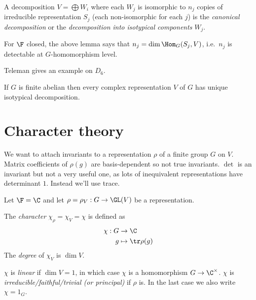 \documentclass[a4paper]{article}
\theoremstyle{definition}
\begin{document}
\begin{definition}
  A decomposition \(V = \bigoplus W_i\) where each \(W_j\) is isomorphic to \(n_j\) copies of irreducible representation \(S_j\) (each non-isomorphic for each \(j\)) is the \emph{canonical decomposition} or the \emph{decomposition into isotypical components} \(W_j\).
\end{definition}

For \(\F\) closed, the above lemma says that \(n_j = \dim \Hom_G(S_j, V)\), i.e.\ \(n_j\) is detectable at \(G\)-homomorphism level.

\begin{eg}
  Teleman  gives an example on \(D_6\).

  If \(G\) is finite abelian then every complex representation \(V\) of \(G\) has unique isotypical decomposition.
\end{eg}

\section{Character theory}

We want to attach invariants to a representation \(\rho\) of a finite group \(G\) on \(V\). Matrix coefficients of \(\rho(g)\) are basis-dependent so not true invariants. \(\det\) is an invariant but not a very useful one, as lots of inequivalent representations have determinant \(1\). Instead we'll use trace.

Let \(\F = \C\) and let \(\rho = \rho_V: G \to \GL(V)\) be a representation.

\begin{definition}[character]
  The \emph{character} \(\chi_\rho = \chi_V = \chi\) is defined as
  \begin{align*}
    \chi: G &\to \C \\
    g &\mapsto \tr \rho(g)
  \end{align*}
  The \emph{degree} of \(\chi_V\) is \(\dim V\).

  \(\chi\) is \emph{linear} if \(\dim V = 1\), in which case \(\chi\) is a homomorphism \(G \to \C^\times\). \(\chi\) is \emph{irreducible/faithful/trivial (or principal)} if \(\rho\) is. In the last case we also write \(\chi = 1_G\).
\end{definition}
\end{document}
